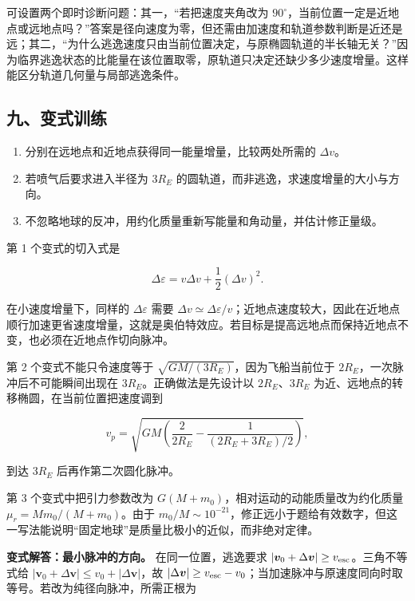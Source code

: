 \documentclass[12pt,a4paper,UTF8]{ctexart}
\newcommand{\tightlist}{\setlength{\itemsep}{0pt}\setlength{\parskip}{0pt}}
\begin{document}
可设置两个即时诊断问题：其一，``若把速度夹角改为
\(90^\circ\)，当前位置一定是近地点或远地点吗？''答案是径向速度为零，但还需由加速度和轨道参数判断是近还是远；其二，``为什么逃逸速度只由当前位置决定，与原椭圆轨道的半长轴无关？''因为临界逃逸状态的比能量在该位置取零，原轨道只决定还缺少多少速度增量。这样能区分轨道几何量与局部逃逸条件。

\subsection{九、变式训练}\label{ux4e5dux53d8ux5f0fux8badux7ec3-1}

\begin{enumerate}
\def\labelenumi{\arabic{enumi}.}
\tightlist
\item
  分别在远地点和近地点获得同一能量增量，比较两处所需的 \(\Delta v\)。
\item
  若喷气后要求进入半径为 \(3R_E\)
  的圆轨道，而非逃逸，求速度增量的大小与方向。
\item
  不忽略地球的反冲，用约化质量重新写能量和角动量，并估计修正量级。
\end{enumerate}

第 1 个变式的切入式是

\[\Delta\varepsilon=v\Delta v+\frac12(\Delta v)^2.\]

在小速度增量下，同样的 \(\Delta\varepsilon\) 需要
\(\Delta v\simeq\Delta\varepsilon/v\)；近地点速度较大，因此在近地点顺行加速更省速度增量，这就是奥伯特效应。若目标是提高远地点而保持近地点不变，也必须在近地点作切向脉冲。

第 2 个变式不能只令速度等于 \(\sqrt{GM/(3R_E)}\)，因为飞船当前位于
\(2R_E\)，一次脉冲后不可能瞬间出现在 \(3R_E\)。正确做法是先设计以
\(2R_E\)、\(3R_E\) 为近、远地点的转移椭圆，在当前位置把速度调到

\[v_p=\sqrt{GM\left(\frac{2}{2R_E}-\frac1{(2R_E+3R_E)/2}\right)},\]

到达 \(3R_E\) 后再作第二次圆化脉冲。

第 3 个变式中把引力参数改为 \(G(M+m_0)\)，相对运动的动能质量改为约化质量
\(\mu_r=Mm_0/(M+m_0)\)。由于
\(m_0/M\sim10^{-21}\)，修正远小于题给有效数字，但这一写法能说明``固定地球''是质量比极小的近似，而非绝对定律。

\textbf{变式解答：最小脉冲的方向。} 在同一位置，逃逸要求
\(|\boldsymbol v_0+\Delta\boldsymbol v|\ge v_{\rm esc}\)。三角不等式给
\(|\boldsymbol v_0+\Delta\boldsymbol v|\le v_0+|\Delta\boldsymbol v|\)，故
\(|\Delta\boldsymbol v|\ge v_{\rm esc}-v_0\)；当加速脉冲与原速度同向时取等号。若改为纯径向脉冲，所需正根为
\end{document}
